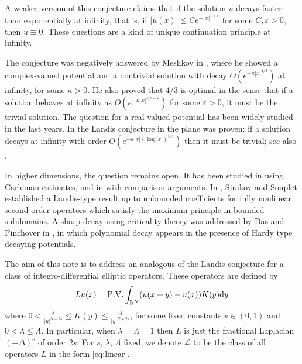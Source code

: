 \documentclass[a4paper,11pt]{article}
\newcommand{\R}{\mathbb{R}}
\newcommand{\dy}{\mathrm{d}y}
\begin{document}
A weaker version of this conjecture claims that if the solution $u$ decays faster than exponentially at infinity, that is, if $|u(x)| \leq Ce^{-|x|^{1+\varepsilon}}$ for some $C, \varepsilon >0$, then $u\equiv 0$. These questions are a kind of unique continuation principle at infinity. 

The conjecture was negatively  answered by Meshkov in \cite{meshkov_possible_1992}, where he showed a complex-valued potential and a nontrivial solution with decay $O(e^{-\kappa|x|^{4/3}})$ at infinity, for some $\kappa > 0$. He also proved that $4/3$ is optimal in the sense that if a solution behaves at infinity as $O(e^{-\kappa|x|^{4/3 + \varepsilon}})$ for some $\varepsilon>0$, it must be the trivial solution. The question for a real-valued potential has been widely studied in the last years. In \cite{logunov_landis_2020} the Landis conjecture in the plane was proven: if a solution decays at infinity with order $O(e^{-\kappa|x|(\log|x|)^{1/2}})$ then it must be trivial; see also \cite{davey_landis_2017, davey_landis_2020, kenig_landis_2015, kenig_quantitative_2015}.

In higher dimensions, the question remains open. It has been studied in \cite{bourgain_localization_2005} using Carleman estimates, and in \cite{rossi_landis_2020} with comparison arguments. In \cite{sirakov_vazquez_2021}, Sirakov and Souplet established a Landis-type result up to unbounded coefficients for fully nonlinear second order operators which satisfy the maximum principle in bounded subdomains. A sharp decay using criticality theory was addressed by Das and Pinchover in \cite{Pinchover}, in which polynomial decay appears in the presence of Hardy type decaying potentials.

The aim of this note is to address an analogous of the Landis conjecture for a class of integro-differential elliptic operators.  These operators are defined by 
\begin{equation}
\label{eq:linear}
Lu(x) = \PV \int_{\R^{N}} (u(x+y) - u(x)) K(y)\dy
\end{equation}
where $0<\frac{\lambda}{|y|^{N+2s}} \leq K(y) \leq \frac{\Lambda}{|y|^{N+2s}}$, for some fixed constants $s\in (0,1)$ and $0< \lambda \leq \Lambda$. In particular, when $\lambda = \Lambda = 1$ then $L$ is just the fractional Laplacian $(-\Delta)^s$  of order $2s$. For $s$, $\lambda$, $\Lambda$ fixed, we denote $\mathcal{L}$ to be the class of all operators $L$ in the form \eqref{eq:linear}. \smallskip
\end{document}
